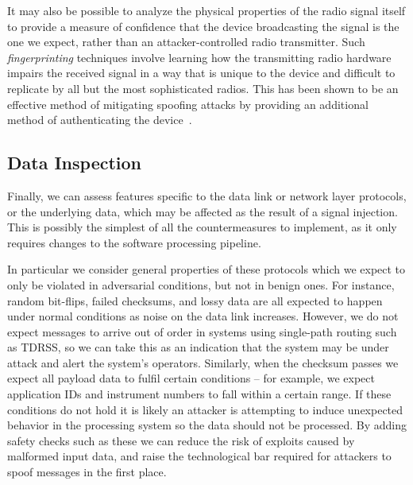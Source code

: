 It may also be possible to analyze the physical properties of the radio signal itself to provide a measure of confidence that the device broadcasting the signal is the one we expect, rather than an attacker-controlled radio transmitter.
Such \textit{fingerprinting} techniques involve learning how the transmitting radio hardware impairs the received signal in a way that is unique to the device and difficult to replicate by all but the most sophisticated radios.
This has been shown to be an effective method of mitigating spoofing attacks by providing an additional method of authenticating the device~\cite{sankheNo2020}.


\subsection{Data Inspection}

Finally, we can assess features specific to the data link or network layer protocols, or the underlying data, which may be affected as the result of a signal injection.
This is possibly the simplest of all the countermeasures to implement, as it only requires changes to the software processing pipeline.

In particular we consider general properties of these protocols which we expect to only be violated in adversarial conditions, but not in benign ones.
For instance, random bit-flips, failed checksums, and lossy data are all expected to happen under normal conditions as noise on the data link increases.
However, we do not expect messages to arrive out of order in systems using single-path routing such as TDRSS, so we can take this as an indication that the system may be under attack and alert the system's operators.
Similarly, when the checksum passes we expect all payload data to fulfil certain conditions -- for example, we expect application IDs and instrument numbers to fall within a certain range.
If these conditions do not hold it is likely an attacker is attempting to induce unexpected behavior in the processing system so the data should not be processed.
By adding safety checks such as these we can reduce the risk of exploits caused by malformed input data, and raise the technological bar required for attackers to spoof messages in the first place.


